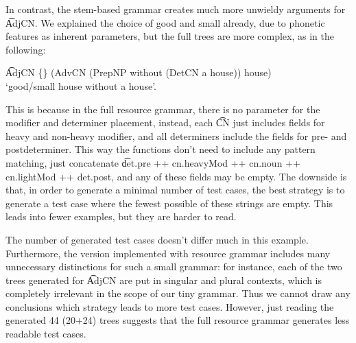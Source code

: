 In contrast, the stem-based grammar creates much more unwieldy
arguments for \t{AdjCN}. We explained the choice of good and small
already, due to phonetic features as inherent parameters, but the full
trees are more complex, as in the following: 

\begin{EmptyItem}
\t{AdjCN \{\} (AdvCN (PrepNP without (DetCN a house))
  house)} \\ `good/small house without a house'.
\end{EmptyItem}

\noindent This is because in the full resource grammar, there is no parameter
for the modifier and determiner placement, instead, each \t{CN} just
includes fields for heavy and non-heavy modifier, and all determiners
include the fields for pre- and postdeterminer. This way the functions
don't need to include any pattern matching, just concatenate
\t{det.pre ++ cn.heavyMod ++ cn.noun ++ cn.lightMod ++ det.post}, and
any of these fields may be empty. The downside is that, in order to
generate a minimal number of test cases, the best strategy is to
generate a test case where the fewest possible of these strings are
empty. This leads into fewer examples, but they are harder to read.

The number of generated test cases doesn't differ much in this
example. Furthermore, the version implemented with resource grammar
includes many unnecessary distinctions for such a small grammar: for
instance, each of the two trees generated for \t{AdjCN} are put in
singular and plural contexts, which is completely irrelevant in the
scope of our tiny grammar.  Thus we cannot draw any conclusions which
strategy leads to more test cases. However, just reading the generated
44 (20+24) trees suggests that the full resource grammar generates less
readable test cases.







